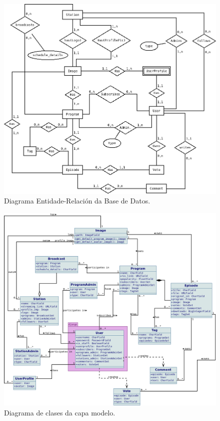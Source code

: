 \begin{figure}[h]
	\centering
	\includegraphics[scale=0.5,keepaspectratio=true]{./images/ER_diagrama.png}
	\caption{Diagrama Entidade-Relación da Base de Datos.}
	\label{fig:diagrama_er}
\end{figure}

\begin{figure}[h]
	\centering
	\includegraphics[scale=0.4,keepaspectratio=true]{./images/class_diagram.png}
	\caption{Diagrama de clases da capa modelo.}
	\label{fig:clase_models}
\end{figure}


